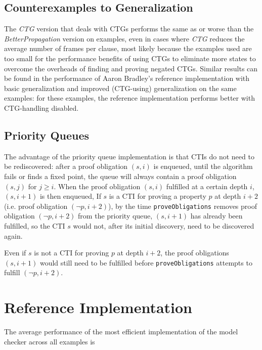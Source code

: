 \documentclass[12pt,a4paper,twoside,openright]{report}
\begin{document}
{\subsection{Counterexamples to Generalization}

The \emph{CTG} version that deals with CTGs performs the same as or worse than the \emph{BetterPropagation} version
on examples, even in cases where \emph{CTG} reduces the average number of frames per clause,
most likely because the examples used are too small for the performance benefits of using CTGs to
eliminate more states to overcome the overheads of finding and proving negated CTGs. Similar results can be found
in the performance of Aaron Bradley's reference implementation with basic generalization and
improved (CTG-using) generalization on the same examples: for these examples, the reference implementation performs
better with CTG-handling disabled.

\subsection{Priority Queues}

The advantage of the priority queue implementation is that CTIs do not need
to be rediscovered: after a proof obligation $(s,i)$ is enqueued, until the algorithm fails or finds a fixed point,
the queue will always contain a proof obligation $(s,j)$ for $j \geq i$. When the proof obligation $(s,i)$
fulfilled at a certain depth $i$, $(s,i + 1)$ is then enqueued, If $s$ is a CTI for proving a property
$p$ at depth $i + 2$ (i.e. proof obligation $(\neg p, i + 2)$), by the time \verb,proveObligations, removes
proof obligation $(\neg p, i + 2)$ from the priority queue, $(s, i+1)$ has already been fulfilled, so the
CTI $s$ would not, after its initial discovery, need to be discovered again.

Even if $s$ is not a CTI for proving $p$ at depth $i + 2$, the proof obligations $(s, i+1)$ would still need to
be fulfilled before \verb,proveObligations, attempts to fulfill $(\neg p, i + 2)$.

\section{Reference Implementation}

The average performance of the most efficient implementation of the model checker across all examples is

}
\end{document}

